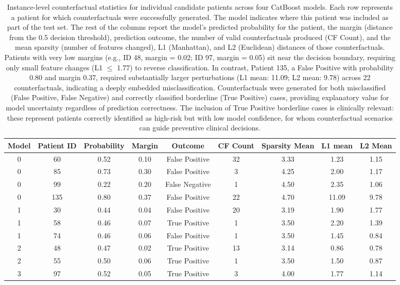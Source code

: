 \documentclass[pdflatex,sn-vancouver-num]{sn-jnl}
\begin{document}
\begin{table}[h]
\footnotesize
\centering
\begin{tabular}{ccccccccc}
\toprule
Model & Patient ID & Probability & Margin & Outcome & CF Count & Sparsity Mean & L1 mean & L2 Mean \\
\midrule
0 & 60 & 0.52 & 0.10 & False Positive  & 32 & 3.33 & 1.23 & 1.15 \\
0 & 85 & 0.73 & 0.30 & False Positive  & 3 & 4.25 & 2.00 & 1.17 \\
0 & 99 & 0.22 & 0.20 & False Negative & 1 & 4.50 & 2.35 & 1.06 \\
0 & 135 & 0.80 & 0.37 & False Positive  & 22 & 4.70 & 11.09 & 9.78 \\
1 & 30 & 0.44 & 0.04 & False Positive  & 20 & 3.19 & 1.90 & 1.77 \\
1 & 58 & 0.46 & 0.07 & True Positive & 1 & 3.50 & 2.20 & 1.39 \\
1 & 74 & 0.46 & 0.06 & False Positive  & 1 & 3.50 & 1.45 & 0.84 \\
2 & 48 & 0.47 & 0.02 & True Positive & 13 & 3.14 & 0.86 & 0.78 \\
2 & 55 & 0.50 & 0.06 & True Positive & 1 & 3.50 & 1.50 & 0.87 \\
3 & 97 & 0.52 & 0.05 & True Positive & 3 & 4.00 & 1.77 & 1.14 \\
\bottomrule
\end{tabular}
\caption{Instance-level counterfactual statistics for individual candidate patients across four CatBoost models. Each row represents a patient for which counterfactuals were successfully generated. The model indicates where this patient was included as part of the test set.   
The rest of the columns report the model's predicted probability for the patient, the margin (distance from the 0.5 decision threshold), prediction outcome, the number of valid counterfactuals produced (CF Count), and the mean sparsity (number of features changed), L1 (Manhattan), and L2 (Euclidean) distances of those counterfactuals. Patients with very low margins (e.g., ID 48, margin = 0.02; ID 97, margin = 0.05) sit near the decision boundary, requiring only small feature changes (L1 $\le$ 1.77) to reverse classification. In contrast, Patient 135, a False Positive with probability 0.80 and margin 0.37, required substantially larger perturbations (L1 mean: 11.09; L2 mean: 9.78) across 22 counterfactuals, indicating a deeply embedded misclassification. Counterfactuals were generated for both misclassified (False Positive, False Negative) and correctly classified borderline (True Positive) cases, providing explanatory value for model uncertainty regardless of prediction correctness. The inclusion of True Positive borderline cases is clinically relevant: these represent patients correctly identified as high-risk but with low model confidence, for whom counterfactual scenarios can guide preventive clinical decisions.
}
\label{tab:localcf-listing}
\end{table}
\end{document}
